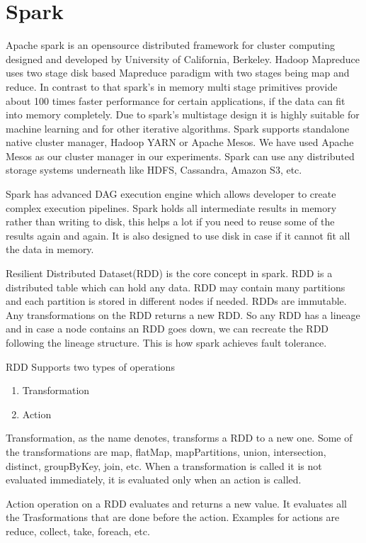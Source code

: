 \medskip

\section{Spark}
Apache spark is an opensource distributed framework for cluster
computing designed and developed by University of California,
Berkeley. Hadoop Mapreduce uses two stage disk based Mapreduce
paradigm with two stages being map and reduce. In contrast to that
spark's in memory multi stage primitives provide about 100 times
faster performance for certain applications, if the data can fit into
memory completely. Due to spark's multistage design it is highly
suitable for machine learning and for other iterative algorithms.
Spark supports standalone native cluster manager, Hadoop YARN or
Apache Mesos. We have used Apache Mesos as our cluster manager in our
experiments. Spark can use any distributed storage systems underneath
like HDFS, Cassandra, Amazon S3, etc.

Spark has advanced DAG execution engine which allows developer to
create complex execution pipelines. Spark holds all intermediate
results in memory rather than writing to disk, this helps a lot if you
need to reuse some of the results again and again. It is also designed
to use disk in case if it cannot fit all the data in memory.

Resilient Distributed Dataset(RDD) is the core concept in spark. RDD
is a distributed table which can hold any data. RDD may contain many
partitions and each partition is stored in different nodes if needed.
RDDs are immutable. Any transformations on the RDD returns a new
RDD. So any RDD has a lineage and in case a node contains an RDD goes
down, we can recreate the RDD following the lineage structure. This is
how spark achieves fault tolerance.

RDD Supports two types of operations
\begin{enumerate}
\item Transformation
\item Action
\end{enumerate}

Transformation, as the name denotes, transforms a RDD to a new
one. Some of the transformations are map, flatMap, mapPartitions,
union, intersection, distinct, groupByKey, join, etc. When a
transformation is called it is not evaluated immediately, it is
evaluated only when an action is called.

Action operation on a RDD evaluates and returns a new value. It
evaluates all the Trasformations that are done before the
action. Examples for actions are reduce, collect, take, foreach, etc.

